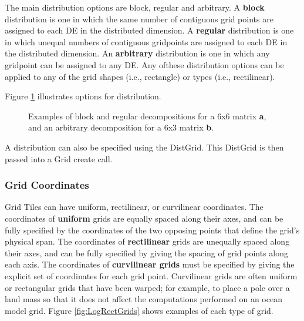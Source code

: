 The main distribution options are block, regular and arbitrary.
A {\bf block} distribution is one in which the same number of
contiguous grid points are assigned to each DE in the
distributed dimension.  A {\bf regular} distribution is one in which
unequal numbers of contiguous gridpoints are assigned to each
DE in the distributed dimension.  An {\bf arbitrary} distribution is
one in which any gridpoint can be assigned to any DE.  Any ofthese
distribution options can be applied to any of the grid shapes (i.e.,
rectangle) or types (i.e., rectilinear).

Figure \ref{fig:GridDecomps} illustrates options for distribution.
\begin{figure}
\caption{Examples of block and regular decompositions for
a 6x6 matrix {\bf a}, and an arbitrary decomposition for a 6x3 matrix {\bf b}.}
\label{fig:GridDecomps}
\end{figure}

A distribution can also be specified using the DistGrid.  This
DistGrid is then passed into a Grid create call.

\subsubsection{Grid Coordinates}
\label{sec:coordspec}
Grid Tiles can have uniform, rectilinear, or curvilinear
coordinates.  The coordinates of {\bf uniform} grids are equally spaced along their axes, and can be fully specified by the coordinates of the two opposing points
that define the grid's physical span.  The coordinates of {\bf rectilinear} grids
are unequally spaced along their axes, and can be fully specified by giving
the spacing of grid points along each axis.  The coordinates of {\bf curvilinear 
grids} must be specified by giving the explicit set of coordinates for each
grid point.  Curvilinear grids are often uniform or rectangular grids that 
have been warped; for example, to place a pole over a land mass so that it
does not affect the computations performed on an ocean model grid.  Figure
\ref{fig:LogRectGrids} shows examples of each type of grid.

